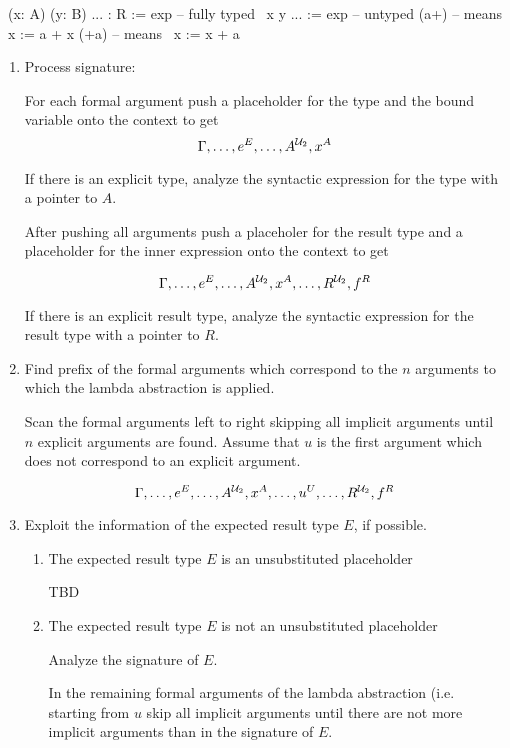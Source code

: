 \begin{alba}
  \ (x: A) (y: B) ... : R := exp      -- fully typed
  \ x y ... := exp                    -- untyped
  (a+)                                -- means \ x := a + x
  (+a)                                -- means \ x := x + a
\end{alba}


\begin{enumerate}
\item Process signature:

  For each formal argument push a placeholder for the type and the bound
  variable onto the context to get
  $$
  \Gamma, \ldots, e^E, \ldots, A^{{\cal{U}}_2}, x^A
  $$

  If there is an explicit type, analyze the syntactic expression for the type
  with a pointer to $A$.

  After pushing all arguments push a placeholer for the result type and a
  placeholder for the inner expression onto the context to get

  $$
  \Gamma, \ldots, e^E, \ldots, A^{{\cal{U}}_2}, x^A, \ldots, R^{{\cal{U}}_2}, f^R
  $$

  If there is an explicit result type, analyze the syntactic expression for the
  result type with a pointer to $R$.


\item Find prefix of the formal arguments which correspond to the $n$
  arguments to which the lambda abstraction is applied.

  Scan the formal arguments left to right skipping all implicit arguments
  until $n$ explicit arguments are found. Assume that $u$ is the first
  argument which does not correspond to an explicit argument.

  $$
  \Gamma, \ldots, e^E, \ldots, A^{{\cal{U}}_2}, x^A, \ldots, u^U, \ldots, R^{{\cal{U}}_2}, f^R
  $$

\item Exploit the information of the expected result type $E$, if possible.

  \begin{enumerate}
  \item The expected result type $E$ is an unsubstituted placeholder

    TBD

  \item The expected result type $E$ is not an unsubstituted placeholder

    Analyze the signature of $E$.

    In the remaining formal arguments of the lambda abstraction (i.e. starting
    from $u$ skip all implicit arguments until there are not more implicit
    arguments than in the signature of $E$.


\end{enumerate}
\end{enumerate}
